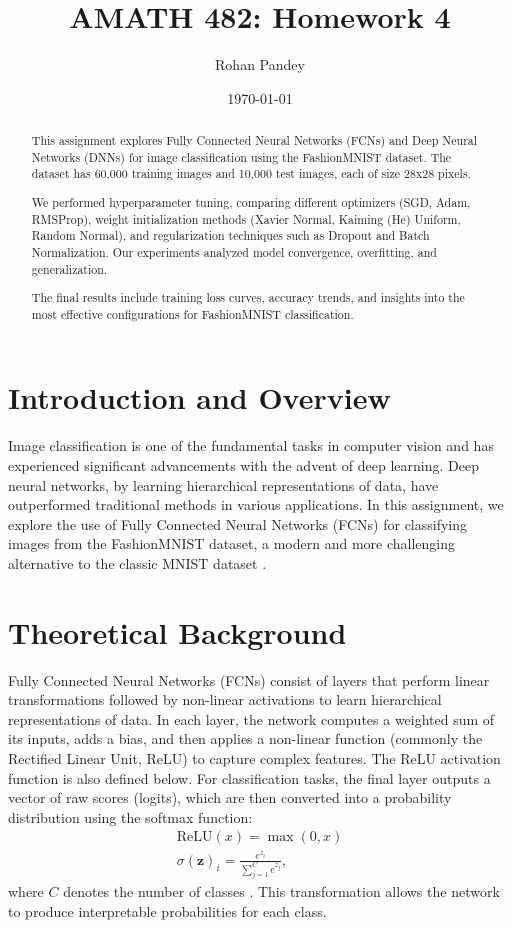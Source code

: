 \documentclass[11pt]{amsart}
\title{AMATH 482: Homework 4}
\author{Rohan Pandey} %
\date{\today} %
\begin{document}
\begin{abstract}
This assignment explores Fully Connected Neural Networks (FCNs) and Deep Neural Networks (DNNs) for image classification using the FashionMNIST dataset. The dataset has 60,000 training images and 10,000 test images, each of size 28x28 pixels.

We performed hyperparameter tuning, comparing different optimizers (SGD, Adam, RMSProp), weight initialization methods (Xavier Normal, Kaiming (He) Uniform, Random Normal), and regularization techniques such as Dropout and Batch Normalization. Our experiments analyzed model convergence, overfitting, and generalization.

The final results include training loss curves, accuracy trends, and insights into the most effective configurations for FashionMNIST classification.
\end{abstract}

\maketitle 

\section{Introduction and Overview}\label{sec:Introduction}
Image classification is one of the fundamental tasks in computer vision and has experienced significant advancements with the advent of deep learning. Deep neural networks, by learning hierarchical representations of data, have outperformed traditional methods in various applications. In this assignment, we explore the use of Fully Connected Neural Networks (FCNs) for classifying images from the FashionMNIST dataset, a modern and more challenging alternative to the classic MNIST dataset \cite{xiao2017fashion}. 


\section{Theoretical Background}\label{sec:theory}
Fully Connected Neural Networks (FCNs) consist of layers that perform linear transformations followed by non-linear activations to learn hierarchical representations of data. In each layer, the network computes a weighted sum of its inputs, adds a bias, and then applies a non-linear function (commonly the Rectified Linear Unit, ReLU) to capture complex features. The ReLU activation function is also defined below. For classification tasks, the final layer outputs a vector of raw scores (logits), which are then converted into a probability distribution using the softmax function:
\begin{align}
\text{ReLU}(x) = \max(0, x)\\
\sigma(\mathbf{z})_i = \frac{e^{z_i}}{\sum_{j=1}^{C} e^{z_j}},
\end{align}
where $C$ denotes the number of classes \cite{Goodfellow-et-al-2016}. This transformation allows the network to produce interpretable probabilities for each class.
\end{document}

